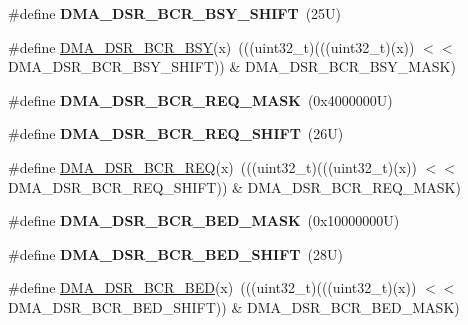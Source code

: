 \begin{DoxyCompactItemize}
\item 
\mbox{\label{group___d_m_a___register___masks_gaa9f53140b5fb6fbbf7cae9d4190bac47}} 
\#define {\bfseries D\+M\+A\+\_\+\+D\+S\+R\+\_\+\+B\+C\+R\+\_\+\+B\+S\+Y\+\_\+\+S\+H\+I\+FT}~(25\+U)
\item 
\#define \mbox{\hyperlink{group___d_m_a___register___masks_gaa4547c9bbe3b978b4b7e7154b68b416b}{D\+M\+A\+\_\+\+D\+S\+R\+\_\+\+B\+C\+R\+\_\+\+B\+SY}}(x)~(((uint32\+\_\+t)(((uint32\+\_\+t)(x)) $<$$<$ D\+M\+A\+\_\+\+D\+S\+R\+\_\+\+B\+C\+R\+\_\+\+B\+S\+Y\+\_\+\+S\+H\+I\+FT)) \& D\+M\+A\+\_\+\+D\+S\+R\+\_\+\+B\+C\+R\+\_\+\+B\+S\+Y\+\_\+\+M\+A\+SK)
\item 
\mbox{\label{group___d_m_a___register___masks_ga24c6d2ae6aa7b472b69e357ef0729902}} 
\#define {\bfseries D\+M\+A\+\_\+\+D\+S\+R\+\_\+\+B\+C\+R\+\_\+\+R\+E\+Q\+\_\+\+M\+A\+SK}~(0x4000000\+U)
\item 
\mbox{\label{group___d_m_a___register___masks_gae04420d59dbb4e54831ac0ddb67d6f74}} 
\#define {\bfseries D\+M\+A\+\_\+\+D\+S\+R\+\_\+\+B\+C\+R\+\_\+\+R\+E\+Q\+\_\+\+S\+H\+I\+FT}~(26\+U)
\item 
\#define \mbox{\hyperlink{group___d_m_a___register___masks_ga00d940be4f5f290d9dedfe7d68ba9c4c}{D\+M\+A\+\_\+\+D\+S\+R\+\_\+\+B\+C\+R\+\_\+\+R\+EQ}}(x)~(((uint32\+\_\+t)(((uint32\+\_\+t)(x)) $<$$<$ D\+M\+A\+\_\+\+D\+S\+R\+\_\+\+B\+C\+R\+\_\+\+R\+E\+Q\+\_\+\+S\+H\+I\+FT)) \& D\+M\+A\+\_\+\+D\+S\+R\+\_\+\+B\+C\+R\+\_\+\+R\+E\+Q\+\_\+\+M\+A\+SK)
\item 
\mbox{\label{group___d_m_a___register___masks_ga958e11f5f7fed3d90bdb94d1c1ff4179}} 
\#define {\bfseries D\+M\+A\+\_\+\+D\+S\+R\+\_\+\+B\+C\+R\+\_\+\+B\+E\+D\+\_\+\+M\+A\+SK}~(0x10000000\+U)
\item 
\mbox{\label{group___d_m_a___register___masks_ga7219c99c1ea8c8a5c029fc998753606b}} 
\#define {\bfseries D\+M\+A\+\_\+\+D\+S\+R\+\_\+\+B\+C\+R\+\_\+\+B\+E\+D\+\_\+\+S\+H\+I\+FT}~(28\+U)
\item 
\#define \mbox{\hyperlink{group___d_m_a___register___masks_ga6ea6e06351bf5e63cd8aa00cc94ad5fe}{D\+M\+A\+\_\+\+D\+S\+R\+\_\+\+B\+C\+R\+\_\+\+B\+ED}}(x)~(((uint32\+\_\+t)(((uint32\+\_\+t)(x)) $<$$<$ D\+M\+A\+\_\+\+D\+S\+R\+\_\+\+B\+C\+R\+\_\+\+B\+E\+D\+\_\+\+S\+H\+I\+FT)) \& D\+M\+A\+\_\+\+D\+S\+R\+\_\+\+B\+C\+R\+\_\+\+B\+E\+D\+\_\+\+M\+A\+SK)
$$
\end{DoxyCompactItemize}

